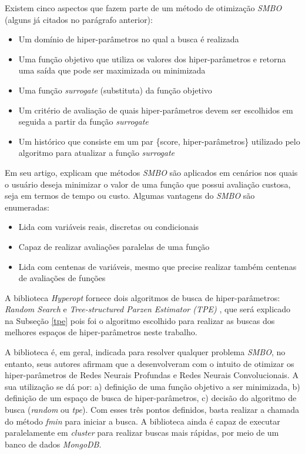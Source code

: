 \documentclass[
12pt,       %
openright,      %
oneside,      %
a4paper,      %
english,      %
french,       %
spanish,      %
brazil        %
]{abntex2}
\begin{document}
Existem cinco aspectos que fazem parte de um método de otimização \textit{SMBO} (alguns já citados no parágrafo anterior):

\begin{itemize}
    \item Um domínio de hiper-parâmetros no qual a busca é realizada
    \item Uma função objetivo que utiliza os valores dos hiper-parâmetros e retorna uma saída que pode ser maximizada ou minimizada
    \item Uma função \textit{surrogate} (substituta) da função objetivo
    \item Um critério de avaliação de quais hiper-parâmetros devem ser escolhidos em seguida a partir da função \textit{surrogate}
    \item Um histórico que consiste em um par \{score, hiper-parâmetros\} utilizado pelo algoritmo para atualizar a função \textit{surrogate}
\end{itemize}

Em seu artigo,  explicam que métodos \textit{SMBO} são aplicados em cenários nos quais o usuário deseja minimizar o valor de uma função que possui avaliação custosa, seja em termos de tempo ou custo. Algumas vantagens do \textit{SMBO} são enumeradas:

\begin{itemize}
    \item Lida com variáveis reais, discretas ou condicionais
    \item Capaz de realizar avaliações paralelas de uma função
    \item Lida com centenas de variáveis, mesmo que precise realizar também centenas de avaliações de funções
\end{itemize}

A biblioteca \textit{Hyperopt} fornece dois algoritmos de busca de hiper-parâmetros: \textit{Random Search} \cite{Bergstra2012} e \textit{Tree-structured Parzen Estimator (TPE)} \cite{bergstra2011algorithms}, que será explicado na Subseção \ref{tpe} pois foi o algoritmo escolhido para realizar as buscas dos melhores espaços de hiper-parâmetros neste trabalho. 

A biblioteca é, em geral, indicada para resolver qualquer problema \textit{SMBO}, no entanto, seus autores afirmam que a desenvolveram com o intuito de otimizar os hiper-parâmetros de Redes Neurais Profundas e Redes Neurais Convolucionais. A sua utilização se dá por: a) definição de uma função objetivo a ser minimizada, b) definição de um espaço de busca de hiper-parâmetros, c) decisão do algoritmo de busca (\textit{random} ou \textit{tpe}). Com esses três pontos definidos, basta realizar a chamada do método \textit{fmin} para iniciar a busca. A biblioteca ainda é capaz de executar paralelamente em \textit{cluster} para realizar buscas mais rápidas, por meio de um banco de dados \textit{MongoDB}.
\end{document}
